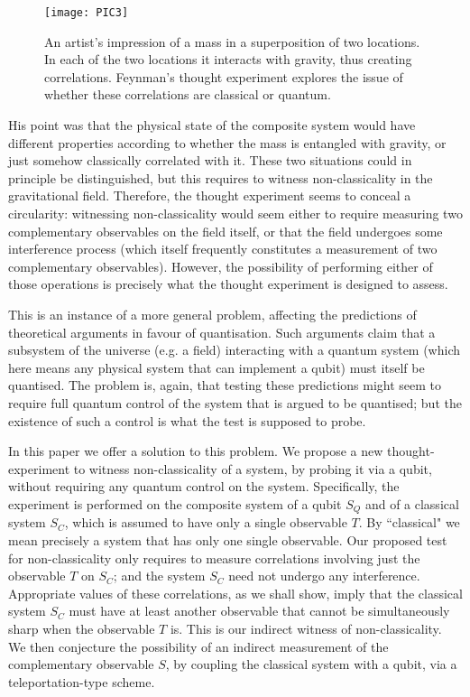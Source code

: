 \documentclass[prl,twocolumn,showpacs,preprintnumbers,amsmath,amssymb]{revtex4}
\newcommand{\qq}[1]{``#1"}
\begin{document}
\begin{figure}[h]
	\centering
	\texttt{[image: PIC3]} 
	\caption{An artist's impression of a mass in a superposition of two locations. In each of the two locations it interacts with gravity, thus creating correlations. Feynman's thought experiment explores the issue of  whether these correlations are classical or quantum. }
\end{figure}


His point was that the physical state of the composite system would have different properties according to whether the mass is entangled with gravity, or just somehow classically correlated with it. These two situations could in principle be distinguished, but this requires to witness non-classicality in the gravitational field. Therefore, the thought experiment seems to conceal a circularity: witnessing non-classicality would seem either to require measuring two complementary observables on the field itself, or that the field undergoes some interference process (which itself frequently constitutes a measurement of two complementary observables). However, the possibility of performing either of those operations is precisely what the thought experiment is designed to assess. 

This is an instance of a more general problem, affecting the predictions of theoretical arguments in favour of quantisation. Such arguments  \cite{FEY, DeW, TER, HEI, BOHRING} claim that a subsystem of the universe (e.g. a field) interacting with a quantum system (which here means any physical system that can implement a qubit) must itself be quantised. The problem is, again, that testing these predictions might seem to require full quantum control of the system that is argued to be quantised; but the existence of such a control is what the test is supposed to probe.

In this paper we offer a solution to this problem. We propose a new thought-experiment to witness non-classicality of a system, by probing it via a qubit, without requiring any quantum control on the system. Specifically, the experiment is performed on the composite system of a qubit $S_Q$ and of a classical system $S_C$, which is assumed to have only a single observable $T$. By \qq{classical} we mean precisely a system that has only one single observable. Our proposed test for non-classicality only requires to measure correlations involving just the observable $T$ on $S_C$; and the system $S_C$ need not undergo any interference. Appropriate values of these correlations, as we shall show, imply that the classical system $S_C$ must have at least another observable that cannot be simultaneously sharp when the observable $T$ is. This is our indirect witness of non-classicality. We then conjecture the possibility of an indirect measurement of the complementary observable $S$, by coupling the classical system with a qubit, via a teleportation-type scheme. 
\end{document}
